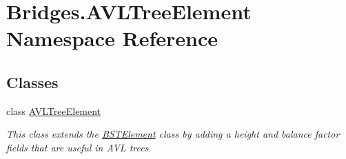 \hypertarget{namespace_bridges_1_1_a_v_l_tree_element}{}\section{Bridges.\+A\+V\+L\+Tree\+Element Namespace Reference}
\label{namespace_bridges_1_1_a_v_l_tree_element}
\subsection*{Classes}
\begin{DoxyCompactItemize}
\item 
class \mbox{\hyperlink{class_bridges_1_1_a_v_l_tree_element_1_1_a_v_l_tree_element}{A\+V\+L\+Tree\+Element}}
\begin{DoxyCompactList}\small\item\em This class extends the \mbox{\hyperlink{namespace_bridges_1_1_b_s_t_element}{B\+S\+T\+Element}} class by adding a height and balance factor fields that are useful in A\+VL trees. \end{DoxyCompactList}\end{DoxyCompactItemize}
